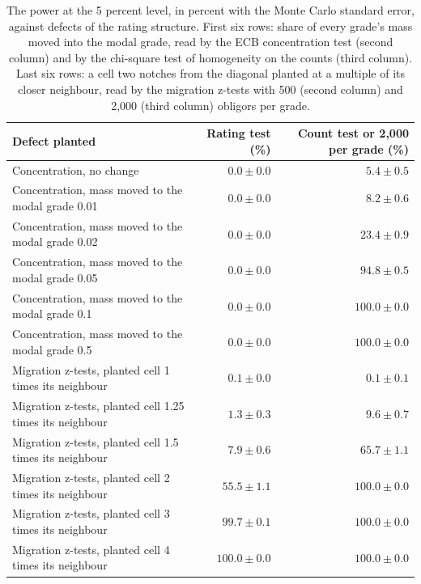 \begin{table}[htbp]
\centering
\setlength{\tabcolsep}{3pt}
\footnotesize
\caption{The power at the 5 percent level, in percent with the Monte Carlo standard error, against defects of the rating structure. First six rows: share of every grade's mass moved into the modal grade, read by the ECB concentration test (second column) and by the chi-square test of homogeneity on the counts (third column). Last six rows: a cell two notches from the diagonal planted at a multiple of its closer neighbour, read by the migration z-tests with 500 (second column) and 2,000 (third column) obligors per grade.}
\label{tab:vt-structure}
\begin{tabular}{p{6.4cm}rr}
\toprule
Defect planted & Rating test (\%) & Count test or 2,000 per grade (\%) \\
\midrule
Concentration, no change & $0.0\pm0.0$ & $5.4\pm0.5$ \\
Concentration, mass moved to the modal grade 0.01 & $0.0\pm0.0$ & $8.2\pm0.6$ \\
Concentration, mass moved to the modal grade 0.02 & $0.0\pm0.0$ & $23.4\pm0.9$ \\
Concentration, mass moved to the modal grade 0.05 & $0.0\pm0.0$ & $94.8\pm0.5$ \\
Concentration, mass moved to the modal grade 0.1 & $0.0\pm0.0$ & $100.0\pm0.0$ \\
Concentration, mass moved to the modal grade 0.5 & $0.0\pm0.0$ & $100.0\pm0.0$ \\
Migration z-tests, planted cell 1 times its neighbour & $0.1\pm0.0$ & $0.1\pm0.1$ \\
Migration z-tests, planted cell 1.25 times its neighbour & $1.3\pm0.3$ & $9.6\pm0.7$ \\
Migration z-tests, planted cell 1.5 times its neighbour & $7.9\pm0.6$ & $65.7\pm1.1$ \\
Migration z-tests, planted cell 2 times its neighbour & $55.5\pm1.1$ & $100.0\pm0.0$ \\
Migration z-tests, planted cell 3 times its neighbour & $99.7\pm0.1$ & $100.0\pm0.0$ \\
Migration z-tests, planted cell 4 times its neighbour & $100.0\pm0.0$ & $100.0\pm0.0$ \\
\bottomrule
\end{tabular}
\end{table}
